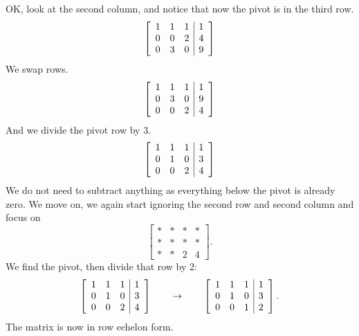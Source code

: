 \documentclass{ximera}
\begin{document}
OK\@, look at the second column, and notice that now the pivot is in the third row.
\begin{equation*}
    \left[
        \begin{array}{ccc|c}
            1 & 1 & 1 & 1 \\
            0 & 0 & 2 & 4 \\
            0 & 3 & 0 & 9
        \end{array}
    \right]
\end{equation*}
We swap rows.
\begin{equation*}
    \left[
        \begin{array}{ccc|c}
            1 & 1 & 1 & 1 \\
            0 & 3 & 0 & 9 \\
            0 & 0 & 2 & 4
        \end{array}
    \right]
\end{equation*}
And we divide the pivot row by 3.
\begin{equation*}
    \left[
        \begin{array}{ccc|c}
            1 & 1 & 1 & 1 \\
            0 & 1 & 0 & 3 \\
            0 & 0 & 2 & 4
        \end{array}
    \right]
\end{equation*}
We do not need to subtract anything as everything below the pivot is already zero.  We move on, we again start ignoring the second row and second column and focus on 
\begin{equation*}
    \left[
        \begin{array}{ccc|c}
            * & * & * & * \\
            * & * & * & * \\
            * & * & 2 & 4
        \end{array}
    \right] .
\end{equation*}
We find the pivot, then divide that row by 2:
\begin{equation*}
    \left[
        \begin{array}{ccc|c}
            1 & 1 & 1 & 1 \\
            0 & 1 & 0 & 3 \\
            0 & 0 & 2 & 4
        \end{array}
    \right] 
    \qquad \to \qquad
    \left[
        \begin{array}{ccc|c}
            1 & 1 & 1 & 1 \\
            0 & 1 & 0 & 3 \\
            0 & 0 & 1 & 2
        \end{array}
    \right] .
\end{equation*}
The matrix is now in row echelon form.
\end{document}
